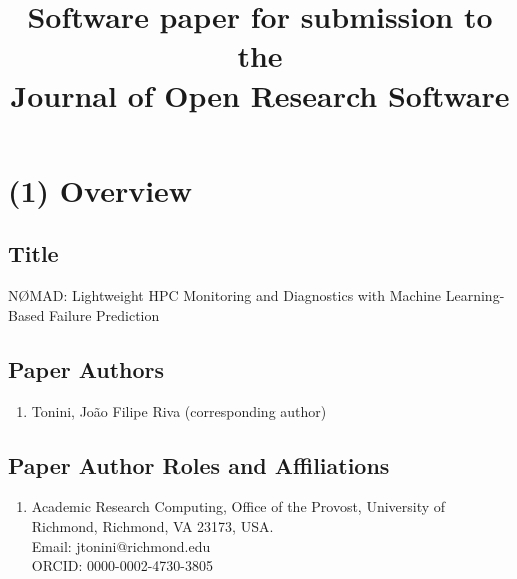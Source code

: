 \documentclass[11pt,a4paper]{article}
\title{Software paper for submission to the\\Journal of Open Research Software}
\author{}
\date{}
\begin{document}
\maketitle

\section*{(1) Overview}

\subsection*{Title}
NØMAD: Lightweight HPC Monitoring and Diagnostics with Machine Learning-Based Failure Prediction

\subsection*{Paper Authors}
\begin{enumerate}
\item Tonini, João Filipe Riva (corresponding author)
\end{enumerate}

\subsection*{Paper Author Roles and Affiliations}
\begin{enumerate}
\item Academic Research Computing, Office of the Provost, University of Richmond, Richmond, VA 23173, USA.\\
Email: jtonini@richmond.edu\\
ORCID: 0000-0002-4730-3805
\end{enumerate}
\end{document}
